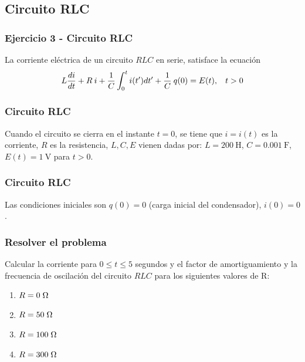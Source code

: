 \subsection{Circuito RLC}
\begin{frame}[plain]
\frametitle{Ejercicio 3 - Circuito RLC}
La corriente eléctrica de un circuito $RLC$ en serie, satisface la ecuación\\
\begin{equation} \label{eq:ecuacion1}
    L \frac{di}{dt} + R \: i+ \frac{1}{C} \int_{0}^{t} i(t^{\prime}) dt^{\prime} +\frac{1}{C} \: q(0) = E(t), \hspace{0.3cm} t > 0 
\end{equation}
\begin{figure}
    \centering
    
\end{figure}
\end{frame}
\begin{frame}
\frametitle{Circuito RLC}
\begin{figure}
    \centering
    
\end{figure}
Cuando el circuito se cierra en el instante $t = 0$, se tiene que $i = i(t)$ es la corriente, $R$ es la resistencia, $L, C, E$ vienen dadas por: $L = \SI{200}{\henry}$, $C = \SI{0.001}{\farad}$, $E(t) = \SI{1}{\volt}$ para $t > 0$.
\end{frame}
\begin{frame}
\frametitle{Circuito RLC}
\begin{figure}
    \centering
    
\end{figure}
Las condiciones iniciales son $q(0)=0$ (carga inicial del condensador), $i(0)=0$. 
\end{frame}
\begin{frame}
\frametitle{Resolver el problema}
Calcular la corriente para $0 \leq t \leq 5$ segundos y el factor de amortiguamiento y la frecuencia de oscilación del circuito $RLC$ para los siguientes valores de R:\\
\begin{enumerate}
    \item $R = 0 \hspace{0.1cm} \Omega$
    \item $R = 50 \hspace{0.1cm} \Omega$
    \item $R = 100 \hspace{0.1cm} \Omega$
    \item $R = 300 \hspace{0.1cm} \Omega$
\end{enumerate}
\end{frame}

